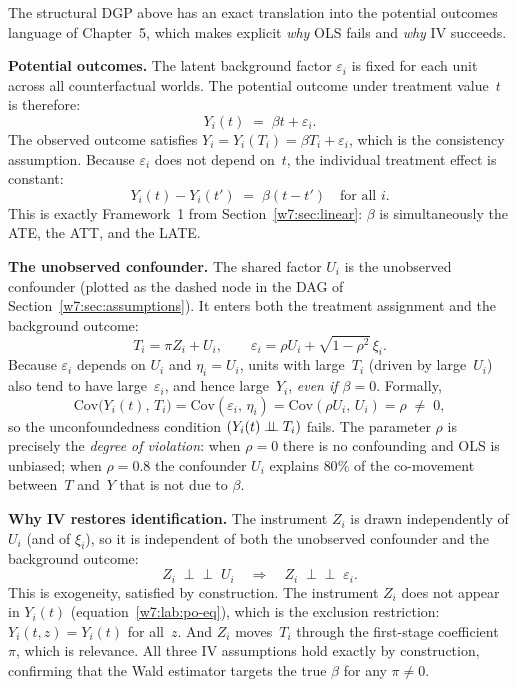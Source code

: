 \documentclass[master.tex]{subfiles}
\begin{document}
\begin{tcolorbox}[defstyle, title={Potential Outcomes Interpretation of the DGP}]
\label{w7:lab:po}
The structural DGP above has an exact translation into the
potential outcomes language of Chapter~5, which makes explicit
\emph{why} OLS fails and \emph{why} IV succeeds.

\medskip\noindent\textbf{Potential outcomes.}
The latent background factor $\varepsilon_i$ is fixed for each
unit across all counterfactual worlds.  The potential outcome
under treatment value~$t$ is therefore:
\begin{equation}
  Y_i(t) \;=\; \beta t + \varepsilon_i.
  \label{w7:lab:po-eq}
\end{equation}
The observed outcome satisfies $Y_i = Y_i(T_i) = \beta T_i +
\varepsilon_i$, which is the consistency assumption.  Because
$\varepsilon_i$ does not depend on~$t$, the individual treatment
effect is constant:
\[
  Y_i(t) - Y_i(t') \;=\; \beta(t - t') \quad \text{for all } i.
\]
This is exactly Framework~1 from Section~\ref{w7:sec:linear}:
$\beta$ is simultaneously the ATE, the ATT, and the LATE.

\medskip\noindent\textbf{The unobserved confounder.}
The shared factor $U_i$ is the unobserved confounder (plotted
as the dashed node in the DAG of
Section~\ref{w7:sec:assumptions}).  It enters both the
treatment assignment and the background outcome:
\[
  T_i = \pi Z_i + U_i,
  \qquad
  \varepsilon_i = \rho U_i + \sqrt{1-\rho^2}\,\xi_i.
\]
Because $\varepsilon_i$ depends on $U_i$ and $\eta_i = U_i$,
units with large~$T_i$ (driven by large~$U_i$) also tend to
have large~$\varepsilon_i$, and hence large~$Y_i$, \emph{even
if $\beta = 0$}.  Formally,
\[
  \mathrm{Cov}\!\bigl(Y_i(t),\, T_i\bigr)
  = \mathrm{Cov}(\varepsilon_i,\, \eta_i)
  = \mathrm{Cov}(\rho U_i,\, U_i) = \rho \;\neq\; 0,
\]
so the unconfoundedness condition $(Y_i(t) \perp\!\!\!\perp T_i)$
fails.  The parameter $\rho$ is precisely the
\emph{degree of violation}: when $\rho = 0$ there is no
confounding and OLS is unbiased; when $\rho = 0.8$ the
confounder $U_i$ explains $80\%$ of the co-movement
between~$T$ and~$Y$ that is not due to $\beta$.

\medskip\noindent\textbf{Why IV restores identification.}
The instrument $Z_i$ is drawn independently of $U_i$
(and of $\xi_i$), so it is independent of both the
unobserved confounder and the background outcome:
\[
  Z_i \;\perp\!\!\!\perp\; U_i
  \quad\Longrightarrow\quad
  Z_i \;\perp\!\!\!\perp\; \varepsilon_i.
\]
This is exogeneity, satisfied by construction.  The
instrument $Z_i$ does not appear in $Y_i(t)$
(equation~\eqref{w7:lab:po-eq}), which is the exclusion
restriction: $Y_i(t, z) = Y_i(t)$ for all~$z$.  And
$Z_i$ moves~$T_i$ through the first-stage coefficient~$\pi$,
which is relevance.  All three IV assumptions hold exactly
by construction, confirming that the Wald estimator targets
the true $\beta$ for any $\pi \neq 0$.


\end{tcolorbox}
\end{document}
